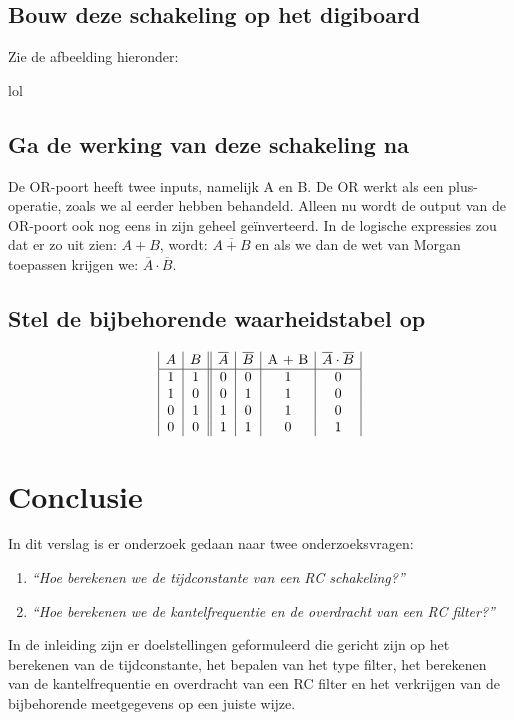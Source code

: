 \documentclass[12pt]{article}
\begin{document}
\subsection{Bouw deze schakeling op het digiboard}
Zie de afbeelding hieronder:

lol

\subsection{Ga de werking van deze schakeling na}
De OR-poort heeft twee inputs, namelijk A en B. De OR werkt als een plus-operatie, zoals we al eerder hebben behandeld. 
Alleen nu wordt de output van de OR-poort ook nog eens in zijn geheel geïnverteerd. In de logische expressies zou dat er zo uit zien: 
$A + B$, wordt: $\overline{A+B}$ en als we dan de wet van Morgan toepassen krijgen we: $\overline{A} \cdot \overline{B}$.

\subsection{Stel de bijbehorende waarheidstabel op}
\begin{displaymath}
    \begin{array}{|c|c||c|c|c|c|}
    A & B & \overline{A} & \overline{B} & $A + B$ & \overline{A} \cdot \overline{B} \\ 
    \hline 
    1 & 1 & 0 & 0 & 1 & 0 \\
    1 & 0 & 0 & 1 & 1 & 0 \\
    0 & 1 & 1 & 0 & 1 & 0 \\
    0 & 0 & 1 & 1 & 0 & 1
    \end{array}
\end{displaymath}

\section{Conclusie}
\label{Conclusie}
In dit verslag is er onderzoek gedaan naar twee onderzoeksvragen: 
\begin{enumerate}
    \item \textit{``Hoe berekenen we de tijdconstante van een RC schakeling?''}
    \item \textit{``Hoe berekenen we de kantelfrequentie en de overdracht van een RC filter?''}
\end{enumerate}
In de inleiding zijn er doelstellingen geformuleerd die gericht zijn op het berekenen van de tijdconstante, het bepalen van het type filter, het berekenen van de kantelfrequentie en overdracht van een RC filter en het verkrijgen van de bijbehorende meetgegevens op een juiste wijze. 
\end{document}
